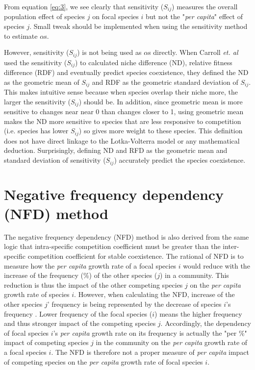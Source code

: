 \documentclass[fleqn]{article}
\begin{document}
\noindent From equation \ref{eq:3}, we see clearly that sensitivity ($S_{ij}$) measures the overall population effect of species ${j}$ on focal species $i$ but not the "\textit{per capita}" effect of species $j$. Small tweak should be implemented when using the sensitivity method to estimate $\alpha$s. 

However, sensitivity ($S_{ij}$) is not being used as $\alpha$s directly. When Carroll \textit{et. al} used the sensitivity ($S_{ij}$) to calculated niche difference (ND), relative fitness difference (RDF) and eventually predict species coexistence, they defined the ND as the geometric mean of $S_{ij}$ and RDF as the geometric standard deviation of $S_{ij}$. This makes intuitive sense because when species overlap their niche more, the larger the sensitivity ($S_{ij}$) should be. In addition, since geometric mean is more sensitive to changes near near 0 than changes closer to 1, using geometric mean makes the ND more sensitive to species that are less responsive to competition (i.e. species has lower $S_{ij}$) so gives more weight to these species. This definition does not have direct linkage to the Lotka-Volterra model or any mathematical deduction. Surprisingly, defining ND and RFD as the geometric mean and standard deviation of sensitivity ($S_{ij}$) accurately predict the species coexistence.  

\newpage
\section{Negative frequency dependency (NFD) method}

The negative frequency dependency (NFD) method \cite{Adler2007} is also derived from the same logic that intra-specific competition coefficient must be greater than the inter-specific competition coefficient for stable coexistence. The rational of NFD is to measure how the \textit{per capita} growth rate of a focal species $i$ would reduce with the increase of the frequency (\%) of the other species ($j$) in a community. This reduction is thus the impact of the other competing species $j$ on the \textit{per capita} growth rate of species $i$. However, when calculating the NFD, increase of the other species $j$' frequency is being represented by the decrease of species $i$'s frequency \cite{Adler2007, Levine2009, Hillerislambers2012, Godoy2014}. Lower frequency of the focal species ($i$) means the higher frequency and thus stronger impact of the competing species $j$. Accordingly, the dependency of focal species $i$'s \textit{per capita} growth rate on its frequency is actually the "per \%" impact of competing species $j$ in the community on the \textit{per capita} growth rate of a focal species $i$. The NFD is therefore not a proper measure of \textit{per capita} impact of competing species on the \textit{per capita} growth rate of focal species $i$. 
\end{document}
